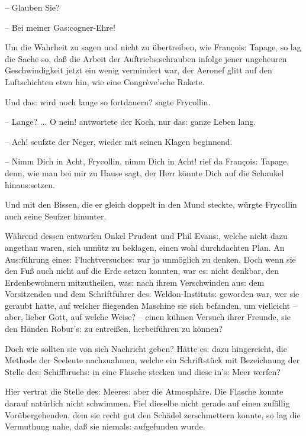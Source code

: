 \documentclass[oneside,12pt]{book}
\newcommand{\s}{s:}
\begin{document}
-- Glauben Sie?

-- Bei meiner Ga{\s}cogner-Ehre!{\grqq}

Um die Wahrheit zu sagen und nicht zu \"ubertreiben, wie
Fran\c{c}oi{\s} Tapage, so lag die Sache so, da{\ss} die Arbeit der
Auftrieb{\s}schrauben infolge jener ungeheuren Geschwindigkeit jetzt
ein wenig vermindert war, der Aeronef glitt auf den Luftschichten
etwa hin, wie eine Congr\`eve'sche Rakete.

{\glqq}Und da{\s} wird noch lange so fortdauern? sagte Frycollin.

-- Lange? ... O nein! antwortete der Koch, nur da{\s} ganze Leben
lang.

-- Ach! seufzte der Neger, wieder mit seinen Klagen beginnend.

-- Nimm Dich in Acht, Frycollin, nimm Dich in Acht! rief da
Fran\c{c}oi{\s} Tapage, denn, wie man bei mir zu Hause sagt, der Herr
k\"onnte Dich auf die Schaukel hinau{\s}setzen.{\grqq}

Und mit den Bissen, die er gleich doppelt in den Mund steckte,
w\"urgte Frycollin auch seine Seufzer hinunter.

W\"ahrend dessen entwarfen Onkel Prudent und Phil Evan{\s}, welche
nicht dazu angethan waren, sich unn\"utz zu beklagen, einen wohl
durchdachten Plan. An Au{\s}f\"uhrung eine{\s} Fluchtversuche{\s} war
ja unm\"oglich zu denken. Doch wenn sie den Fu{\ss} auch nicht auf
die Erde setzen konnten, war e{\s} nicht denkbar, den Erdenbewohnern
mit\/zutheilen, wa{\s} nach ihrem Verschwinden au{\s} dem Vorsitzenden
und dem Schriftf\"uhrer de{\s} Weldon-Institut{\s} geworden war, wer
sie geraubt hatte, auf welcher fliegenden Maschine sie sich befanden,
um vielleicht -- aber, lieber Gott, auf welche Weise? -- einen
k\"uhnen Versuch ihrer Freunde, sie den H\"anden Robur'{\s} zu
entrei{\ss}en, herbeif\"uhren zu k\"onnen?

Doch wie sollten sie von sich Nachricht geben? H\"atte e{\s} dazu
hingereicht, die Methode der Seeleute nachzuahmen, welche ein
Schriftst\"uck mit Bezeichnung der Stelle de{\s} Schiffbruch{\s} in
eine Flasche stecken und diese in'{\s} Meer werfen?

Hier vertrat die Stelle de{\s} Meere{\s} aber die Atmosph\"are. Die
Flasche konnte darauf nat\"urlich nicht schwimmen. Fiel dieselbe
nicht gerade auf einen zuf\"allig Vor\"ubergehenden, dem sie recht
gut den Sch\"adel zerschmettern konnte, so lag die Vermuthung nahe,
da{\ss} sie niemal{\s} aufgefunden wurde.
\end{document}
